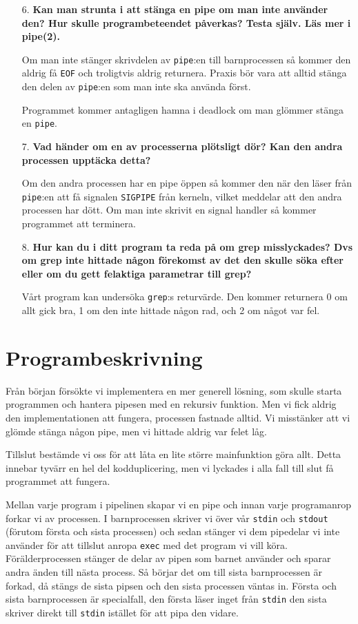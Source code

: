 \documentclass[a4paper,10pt,titlepage]{article}
\begin{document}
\begin{enumerate}
	\item[6.] \textbf{\footnotesize Kan man strunta i att stänga en pipe om man inte använder den? Hur skulle programbeteendet påverkas? Testa själv. Läs mer i pipe(2).}

	Om man inte stänger skrivdelen av \verb!pipe!:en till barnprocessen så kommer den aldrig få \verb!EOF! och troligtvis aldrig returnera. Praxis bör vara att alltid stänga den delen av \verb!pipe!:en som man inte ska använda först.

	Programmet kommer antagligen hamna i deadlock om man glömmer stänga en \verb!pipe!.

	\item[7.] \textbf{\footnotesize Vad händer om en av processerna plötsligt dör? Kan den andra processen upptäcka detta?}

	Om den andra processen har en pipe öppen så kommer den när den läser från \verb!pipe!:en att få signalen \verb!SIGPIPE! från kerneln, vilket meddelar att den andra processen har dött. Om man inte skrivit en signal handler så kommer programmet att terminera.

	\item[8.] \textbf{\footnotesize Hur kan du i ditt program ta reda på om grep misslyckades? Dvs om grep inte hittade någon förekomst av det den skulle söka efter eller om du gett felaktiga parametrar till grep?}

	Vårt program kan undersöka \verb!grep!:s returvärde. Den kommer returnera 0 om allt gick bra, 1 om den inte hittade någon rad, och 2 om något var fel.	
\end{enumerate}

\newpage
\section{Programbeskrivning}

Från början försökte vi implementera en mer generell lösning, som skulle starta programmen
och hantera pipesen med en rekursiv funktion. Men vi fick aldrig den
implementationen att fungera, processen fastnade alltid. Vi misstänker att vi
glömde stänga någon pipe, men vi hittade aldrig var felet låg.

Tillslut bestämde vi oss för att låta en lite större mainfunktion göra allt.
Detta innebar tyvärr en hel del kodduplicering, men vi lyckades i alla fall till
slut få programmet att fungera.

Mellan varje program i pipelinen skapar vi en pipe och innan varje programanrop
forkar vi av processen. I barnprocessen skriver vi över vår \verb!stdin! och
\verb!stdout! (förutom första och sista processen) och sedan stänger vi dem pipedelar
vi inte använder för att tillslut anropa \verb!exec! med det program vi
vill köra. Förälderprocessen stänger de delar av pipen som barnet använder och
sparar andra änden till nästa process. Så börjar det om till sista
barnprocessen är forkad, då stängs de sista pipsen och den sista processen
väntas in. Första och sista barnprocessen är
specialfall, den första läser inget från \verb!stdin! den sista skriver direkt
till \verb!stdin! istället för att pipa den vidare.
\end{document}
